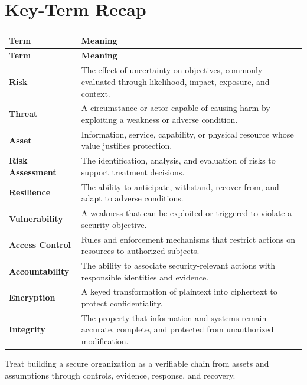 \documentclass[11pt]{article}
\begin{document}
\section*{Key-Term Recap}
\begin{longtable}{>{\RaggedRight\arraybackslash}p{}>{\RaggedRight\arraybackslash}p{}}
\toprule\rowcolor{Navy}\color{white}\textbf{Term} & \color{white}\textbf{Meaning}\\\midrule
\endfirsthead
\toprule\rowcolor{Navy}\color{white}\textbf{Term} & \color{white}\textbf{Meaning}\\\midrule
\endhead
\textbf{Risk} & The effect of uncertainty on objectives, commonly evaluated through likelihood, impact, exposure, and context. \\\midrule
\textbf{Threat} & A circumstance or actor capable of causing harm by exploiting a weakness or adverse condition. \\\midrule
\textbf{Asset} & Information, service, capability, or physical resource whose value justifies protection. \\\midrule
\textbf{Risk Assessment} & The identification, analysis, and evaluation of risks to support treatment decisions. \\\midrule
\textbf{Resilience} & The ability to anticipate, withstand, recover from, and adapt to adverse conditions. \\\midrule
\textbf{Vulnerability} & A weakness that can be exploited or triggered to violate a security objective. \\\midrule
\textbf{Access Control} & Rules and enforcement mechanisms that restrict actions on resources to authorized subjects. \\\midrule
\textbf{Accountability} & The ability to associate security-relevant actions with responsible identities and evidence. \\\midrule
\textbf{Encryption} & A keyed transformation of plaintext into ciphertext to protect confidentiality. \\\midrule
\textbf{Integrity} & The property that information and systems remain accurate, complete, and protected from unauthorized modification. \\\midrule
\bottomrule
\end{longtable}
\begin{takeawaybox}
Treat building a secure organization as a verifiable chain from assets and assumptions through controls, evidence, response, and recovery.
\end{takeawaybox}
\end{document}
